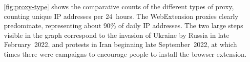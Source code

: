 \documentclass[letterpaper,twocolumn]{article}
\begin{document}
\autoref{fig:proxy-type} shows the
comparative counts of the different types of proxy,
counting unique IP addresses per 24~hours.
The WebExtension proxies clearly predominate,
representing about 90\% of daily IP addresses.
The two large steps visible in the graph correspond
to the invasion of Ukraine by Russia in late February~2022,
and protests in Iran beginning late September~2022,
at which times there were campaigns
to encourage people to install the browser extension.
\end{document}
